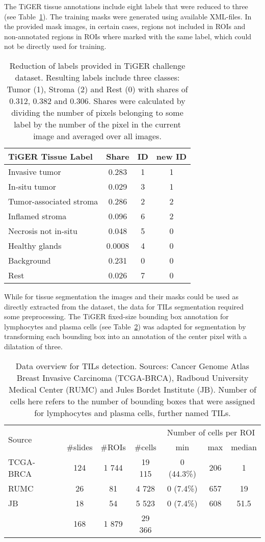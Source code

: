 The TiGER tissue annotations include eight
labels that were reduced to three (see Table~\ref*{tab:label_data}).
The training masks were generated using available XML-files. In the provided mask
images, in certain cases, regions not included in ROIs and non-annotated regions in ROIs where
marked with the same label, which could not be directly used for training.
\begin{table}[h!]
\centering
\begin{tabular}{ l c c c } 
\hline
TiGER Tissue Label & Share & ID & new ID  \\ 
\hline
Invasive tumor & 0.283 & 1 & 1 \\ 
In-situ tumor & 0.029 & 3 & 1 \\ 
Tumor-associated stroma & 0.286 & 2 & 2\\
Inflamed stroma & 0.096 & 6 & 2\\
Necrosis not in-situ & 0.048 & 5 & 0\\
Healthy glands & 0.0008 & 4 & 0 \\ 
Background & 0.231 & 0 & 0 \\ 
Rest & 0.026 & 7 & 0\\
\hline
\end{tabular}
\caption{\label{tab:label_data} Reduction of labels provided in TiGER challenge dataset. Resulting labels include three classes: Tumor (1), Stroma (2) and Rest (0) with shares of 0.312, 0.382 and 0.306. Shares were calculated by dividing
the number of pixels belonging to some label by the number of the pixel in the current image and averaged over all images. }
\end{table}

While for tissue segmentation the images and their masks could be used as directly extracted from the 
dataset, the data for TILs segmentation required some preprocessing. The TiGER fixed-size bounding box
annotation for lymphocytes and plasma cells (see Table~\ref*{tab:tils_data}) was adapted for segmentation by transforming each
bounding box into an annotation of the center pixel with a dilatation of three.
\begin{table}[h!]
\centering
\begin{tabular}{ l c c c c c c } 
\hline
\multirow{2}{*}{Source} & & & & \multicolumn{3}{c}{Number of cells per ROI}\\ 
\cline{2-7}
 & \#slides & \#ROIs & \#cells & min & max & median \\ 
\hline
TCGA-BRCA & 124 & 1 744 & 19 115 & 0 (44.3\%) & 206 & 1\\ 
RUMC & 26 & 81 & 4 728 & 0 (7.4\%) & 657 & 19\\ 
JB & 18 & 54 & 5 523 & 0 (7.4\%) & 608 & 51.5\\
\hline
 & 168 & 1 879 & 29 366 & & &\\
\end{tabular}
\caption{\label{tab:tils_data} Data overview for TILs detection. Sources: Cancer Genome Atlas Breast Invasive Carcinoma (TCGA-BRCA),
Radboud University Medical Center (RUMC) and Jules Bordet Institute (JB). Number of cells here refers to the number of
bounding boxes that were assigned for lymphocytes and plasma cells, further named TILs.}
\end{table}

